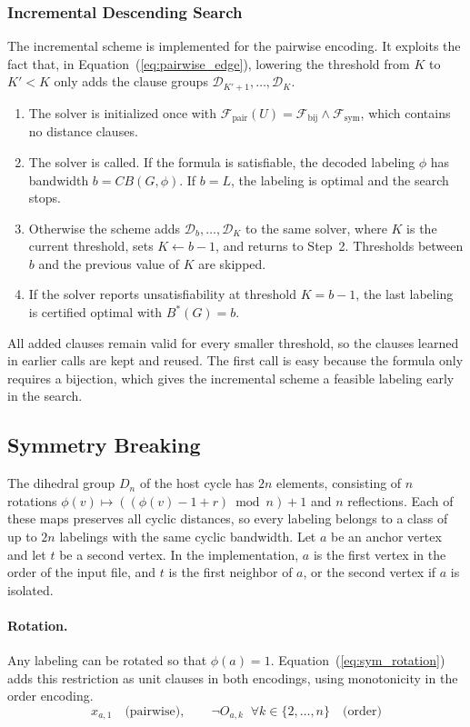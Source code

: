 \documentclass[a4paper,fleqn]{cas-sc}
\begin{document}
\subsubsection{Incremental Descending Search}
The incremental scheme is implemented for the pairwise encoding. It exploits the fact that, in Equation~(\ref{eq:pairwise_edge}), lowering the threshold from $K$ to $K'<K$ only adds the clause groups $\mathcal{D}_{K'+1},\dots,\mathcal{D}_K$.
\begin{enumerate}
    \item The solver is initialized once with $\mathcal{F}_{\text{pair}}(U)=\mathcal{F}_{\text{bij}}\land\mathcal{F}_{\text{sym}}$, which contains no distance clauses.
    \item The solver is called. If the formula is satisfiable, the decoded labeling $\phi$ has bandwidth $b=CB(G,\phi)$. If $b=L$, the labeling is optimal and the search stops.
    \item Otherwise the scheme adds $\mathcal{D}_b,\dots,\mathcal{D}_K$ to the same solver, where $K$ is the current threshold, sets $K\gets b-1$, and returns to Step~2. Thresholds between $b$ and the previous value of $K$ are skipped.
    \item If the solver reports unsatisfiability at threshold $K=b-1$, the last labeling is certified optimal with $B^*(G)=b$.
\end{enumerate}
All added clauses remain valid for every smaller threshold, so the clauses learned in earlier calls are kept and reused. The first call is easy because the formula only requires a bijection, which gives the incremental scheme a feasible labeling early in the search.

\subsection{Symmetry Breaking}
\label{sec:symmetry}

The dihedral group $D_n$ of the host cycle has $2n$ elements, consisting of $n$ rotations $\phi(v)\mapsto((\phi(v)-1+r)\bmod n)+1$ and $n$ reflections. Each of these maps preserves all cyclic distances, so every labeling belongs to a class of up to $2n$ labelings with the same cyclic bandwidth. Let $a$ be an anchor vertex and let $t$ be a second vertex. In the implementation, $a$ is the first vertex in the order of the input file, and $t$ is the first neighbor of $a$, or the second vertex if $a$ is isolated.

\paragraph{Rotation.} Any labeling can be rotated so that $\phi(a)=1$. Equation~(\ref{eq:sym_rotation}) adds this restriction as unit clauses in both encodings, using monotonicity in the order encoding.
\begin{equation}
    x_{a,1}\quad\text{(pairwise)},\qquad \neg O_{a,k}\;\;\forall k\in\{2,\dots,n\}\quad\text{(order)}
    \label{eq:sym_rotation}
\end{equation}
\end{document}
